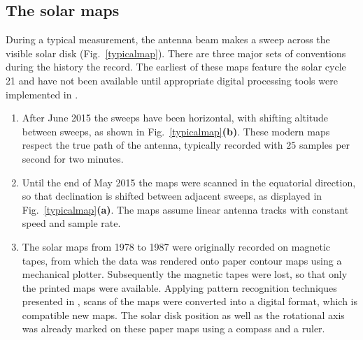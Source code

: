\documentclass{aa}
\begin{document}
\subsection{The solar maps}\label{sect:source}


  During a typical measurement, the antenna beam makes a sweep across the visible solar disk (Fig.~\ref{typicalmap}). 
  There are three major sets of conventions during the history the record. The earliest of these maps feature the solar 
  cycle 21 and have not been available until appropriate digital processing tools were implemented in \cite{masterthesis}.
  \begin{enumerate}[A]
    \item
    After June 2015 the sweeps have been horizontal, with shifting altitude
    between sweeps, as shown in Fig.~\ref{typicalmap}{\bf(b)}.
    These modern maps respect the true path of the antenna, typically recorded
    with $25$ samples per second for two minutes.
    \item
    Until the end of May 2015 the maps were scanned in the equatorial direction,
    so that declination is shifted between adjacent sweeps, as displayed in
    Fig.~\ref{typicalmap}{\bf(a)}.
    The maps assume linear antenna tracks with constant speed and sample rate.
    \item
    The solar maps from 1978 to 1987 were originally recorded on magnetic
    tapes, from which the data was rendered onto paper contour maps using a
    mechanical plotter.
    Subsequently the magnetic tapes were lost, so that only the printed maps
    were available. Applying pattern recognition techniques presented in \cite{masterthesis}, scans of the maps were converted into
    a digital format, which is compatible new maps.
    The solar disk position as well as the rotational axis was already marked on these paper maps using a compass and a ruler.
  \end{enumerate}
\end{document}
